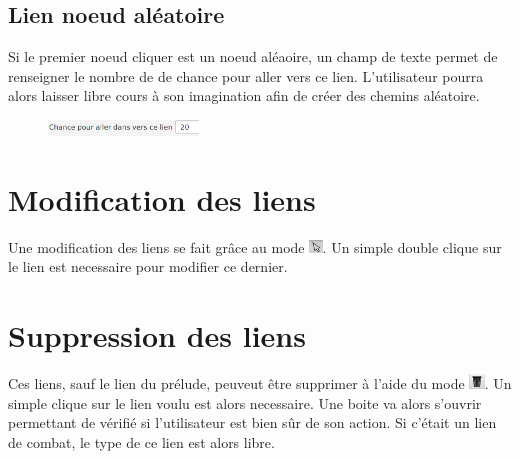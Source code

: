 		\subsection{Lien noeud aléatoire}\label{subsection:lienAléatoire}
			Si le premier noeud cliquer est un noeud aléaoire, un champ de texte permet de renseigner le nombre de de chance pour aller vers ce lien. L'utilisateur pourra alors laisser libre cours à son imagination afin de créer des chemins aléatoire.\\

			\begin{figure}[H]
				\centering\includegraphics[width=4cm]{img/lienAleatoire.png}
			\end{figure}


	\section{Modification des liens}
		Une modification des liens se fait grâce au mode \includegraphics[height=10pt]{img/modeSelected.png}. Un simple double clique sur le lien est necessaire pour modifier ce dernier.

	\section{Suppression des liens}
		Ces liens, sauf le lien du prélude, peuveut être supprimer à l'aide du mode \includegraphics[height=0.4cm]{img/modeSupression.png}. Un simple clique sur le lien voulu est alors necessaire. Une boite va alors s'ouvrir permettant de vérifié si l'utilisateur est bien sûr de son action.
		Si c'était un lien de combat, le type de ce lien est alors libre.
